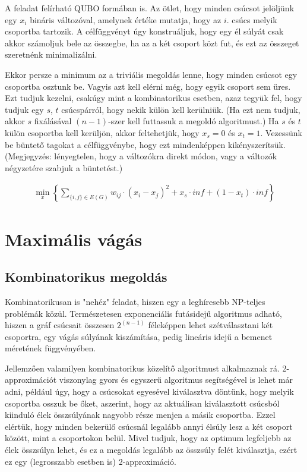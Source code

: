 A feladat felírható QUBO formában is. Az ötlet, hogy minden csúcsot jelöljünk egy $x_i$ bináris változóval, amelynek értéke mutatja, hogy az $i.$ csúcs melyik csoportba tartozik. A célfüggvényt úgy konstruáljuk, hogy egy él súlyát csak akkor számoljuk bele az összegbe, ha az a két csoport közt fut, és ezt az összeget szeretnénk minimalizálni.

Ekkor persze a minimum az a triviális megoldás lenne, hogy minden csúcsot egy csoportba osztunk be. Vagyis azt kell elérni még, hogy egyik csoport sem üres.
Ezt tudjuk kezelni, csakúgy mint a kombinatorikus esetben, azaz tegyük fel, hogy tudjuk egy $s$, $t$ csúcspárról, hogy nekik külön kell kerülniük. (Ha ezt nem tudjuk, akkor $s$ fixálásával $(n-1)$-szer kell futtassuk a megoldó algoritmust.)
Ha $s$ és $t$ külön csoportba kell kerüljön, akkor feltehetjük, hogy $x_s=0$ és $x_t=1$. Vezessünk be büntető tagokat a célfüggvénybe, hogy ezt mindenképpen kikényszerítsük. (Megjegyzés: lényegtelen, hogy a változókra direkt módon, vagy a változók négyzetére szabjuk a büntetést.)

\begin{align}
	\min_{x} \left\{ \sum_ {\{i,j\}\in E(G)}{w_{ij}\cdot(x_i-x_j)^2} + x_s\cdot inf + (1-x_t)\cdot inf \right\}
\end{align}


\section{Maximális vágás}

\subsection{Kombinatorikus megoldás}

Kombinatorikusan is "nehéz" feladat, hiszen egy a leghíresebb NP-teljes problémák közül. Természetesen exponenciális futásidejű algoritmus adható, hiszen a gráf csúcsait összesen $2^(n-1)$ féleképpen lehet szétválasztani két csoportra, egy vágás súlyának kiszámítása, pedig lineáris idejű a bemenet méretének függvényében.

Jellemzően valamilyen kombinatorikus közelítő algoritmust alkalmaznak rá. 2-approximációt viszonylag gyors és egyszerű algoritmus segítségével is lehet már adni, például úgy, hogy a csúcsokat egyesével kiválasztva döntünk, hogy melyik csoportba osszuk be őket, aszerint, hogy az aktuálisan kiválasztott csúcsból kiinduló élek összsúlyának nagyobb része menjen a másik csoportba. Ezzel elértük, hogy minden bekerülő csúcsnál legalább annyi élsúly lesz a két csoport között, mint a csoportokon belül. Mivel tudjuk, hogy az optimum legfeljebb az élek összsúlya lehet, és ez a megoldás legalább az összsúly felét kiválasztja, ezért ez egy (legrosszabb esetben is) 2-approximáció.

